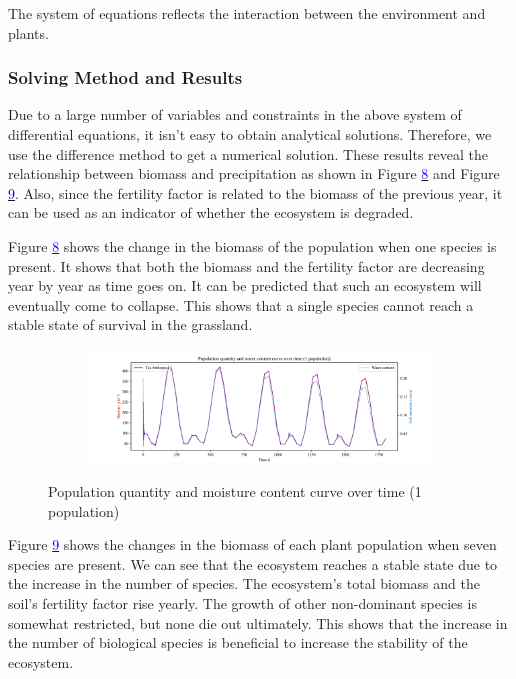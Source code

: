 \documentclass{mcmthesis}
\begin{document}
The system of equations reflects the interaction between the environment and plants.

\subsubsection{Solving Method and Results}

\indent

Due to a large number of variables and constraints in the above system of differential equations, it isn't easy to obtain analytical solutions. Therefore, we use the difference method to get a numerical solution. These results reveal the relationship between biomass and precipitation as shown in Figure \hyperref[fig:pure_1]{\textcolor{blue}{8}} and Figure \hyperref[fig:pure_7]{\textcolor{blue}{9}}. Also, since the fertility factor is related to the biomass of the previous year, it can be used as an indicator of whether the ecosystem is degraded.

Figure \hyperref[fig:pure_1]{\textcolor{blue}{8}} shows the change in the biomass of the population when one species is present. It shows that both the biomass and the fertility factor are decreasing year by year as time goes on. It can be predicted that such an ecosystem will eventually come to collapse. This shows that a single species cannot reach a stable state of survival in the grassland.

\begin{figure}[h]
\centering 
\begin{subfigure}{ \textwidth}
\includegraphics[width=\textwidth]{img/1_pure.pdf}
\end{subfigure}
\caption{Population quantity and moisture content curve over time (1 population)}
\label{fig:pure_1}
\end{figure}

Figure \hyperref[fig:pure_7]{\textcolor{blue}{9}} shows the changes in the biomass of each plant population when seven species are present. We can see that the ecosystem reaches a stable state due to the increase in the number of species. The ecosystem's total biomass and the soil's fertility factor rise yearly. The growth of other non-dominant species is somewhat restricted, but none die out ultimately. This shows that the increase in the number of biological species is beneficial to increase the stability of the ecosystem.
\end{document}
